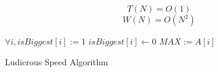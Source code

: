 \documentclass[twoside]{article}
\begin{document}
$$T(N) = O(1)$$
$$W(N) = O(N^2)$$

\begin{algorithm}
    \begin{algorithmic}[]
	\State $\forall i, isBiggest[i] := 1$
            	\State $isBiggest[i] \gets 0$
	    \EndIf
        \EndFor
	   \State $MAX := A[i]$
	\EndIf
    \end{algorithmic}
    \caption{Ludicrous Speed Algorithm}
\end{algorithm}
\end{document}
